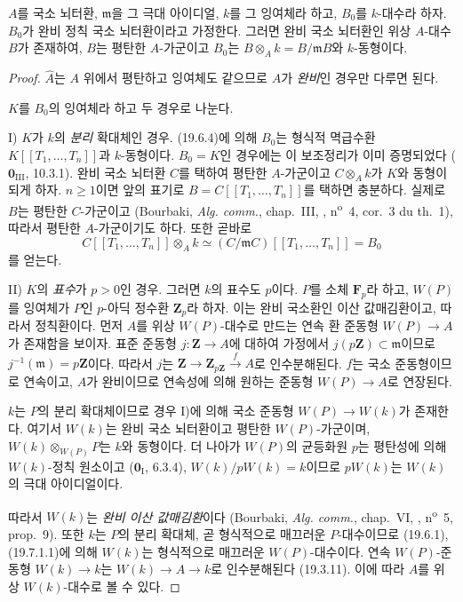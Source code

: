 \begin{lemma}[19.7.1.3]
\label{0.19.7.1.3-ko}
$A$를 국소 뇌터환, $\mathfrak m$을 그 극대 아이디얼, $k$를 그
잉여체라 하고, $B_0$를 $k$-대수라 하자. $B_0$가 완비 정칙 국소
뇌터환이라고 가정한다. 그러면 완비 국소 뇌터환인 위상 $A$-대수
$B$가 존재하여, $B$는 평탄한 $A$-가군이고 $B_0$는
$B\otimes_A k=B/\mathfrak mB$와 $k$-동형이다.
\end{lemma}

\begin{proof}
$\widehat A$는 $A$ 위에서 평탄하고 잉여체도 같으므로 $A$가
\emph{완비}인 경우만 다루면 된다.

$K$를 $B_0$의 잉여체라 하고 두 경우로 나눈다.

\medskip
\noindent I) $K$가 $k$의 \emph{분리} 확대체인 경우. (19.6.4)에 의해
$B_0$는 형식적 멱급수환 $K[[T_1,\ldots,T_n]]$과 $k$-동형이다.
$B_0=K$인 경우에는 이 보조정리가 이미 증명되었다
($\mathbf 0_{\mathrm{III}}$, 10.3.1). 완비 국소 뇌터환 $C$를 택하여
평탄한 $A$-가군이고 $C\otimes_A k$가 $K$와 동형이 되게 하자.
$n\geq1$이면 앞의 표기로 $B=C[[T_1,\ldots,T_n]]$를 택하면 충분하다.
실제로 $B$는 평탄한 $C$-가군이고 (Bourbaki, \emph{Alg. comm.},
chap.~III, , n\textsuperscript{o}~4, cor.~3 du th.~1), 따라서
평탄한 $A$-가군이기도 하다. 또한 곧바로
\[
  C[[T_1,\ldots,T_n]]\otimes_A k
  \simeq(C/\mathfrak mC)[[T_1,\ldots,T_n]]=B_0
\]
를 얻는다.

\medskip
\noindent II) $K$의 \emph{표수}가 $p>0$인 경우. 그러면 $k$의 표수도
$p$이다. $P$를 소체 $\mathbf F_p$라 하고, $W(P)$를 잉여체가 $P$인
$p$-아딕 정수환 $\mathbf Z_p$라 하자. 이는 완비 국소환인 이산
값매김환이고, 따라서 정칙환이다. 먼저 $A$를 위상 $W(P)$-대수로
만드는 연속 환 준동형 $W(P)\to A$가 존재함을 보이자. 표준 준동형
$j:\mathbf Z\to A$에 대하여 가정에서
$j(p\mathbf Z)\subset\mathfrak m$이므로
$j^{-1}(\mathfrak m)=p\mathbf Z$이다. 따라서 $j$는
$\mathbf Z\to\mathbf Z_{p\mathbf Z}\xrightarrow{f}A$로 인수분해된다.
$f$는 국소 준동형이므로 연속이고, $A$가 완비이므로 연속성에 의해
원하는 준동형 $W(P)\to A$로 연장된다.

$k$는 $P$의 분리 확대체이므로 경우 I)에 의해 국소 준동형
$W(P)\to W(k)$가 존재한다. 여기서 $W(k)$는 완비 국소 뇌터환이고
평탄한 $W(P)$-가군이며,
$W(k)\otimes_{W(P)}P$는 $k$와 동형이다. 더 나아가 $W(P)$의
균등화원 $p$는 평탄성에 의해 $W(k)$-정칙 원소이고
($\mathbf 0_{\mathrm I}$, 6.3.4), $W(k)/pW(k)=k$이므로 $pW(k)$는
$W(k)$의 극대 아이디얼이다.


따라서 $W(k)$는 \emph{완비 이산 값매김환}이다 (Bourbaki,
\emph{Alg. comm.}, chap.~VI, , n\textsuperscript{o}~5,
prop.~9). 또한 $k$는 $P$의 분리 확대체, 곧 형식적으로 매끄러운
$P$-대수이므로 (19.6.1), (19.7.1.1)에 의해 $W(k)$는 형식적으로
매끄러운 $W(P)$-대수이다. 연속 $W(P)$-준동형 $W(k)\to k$는
$W(k)\to A\to k$로 인수분해된다 (19.3.11). 이에 따라 $A$를 위상
$W(k)$-대수로 볼 수 있다.


\end{proof}
